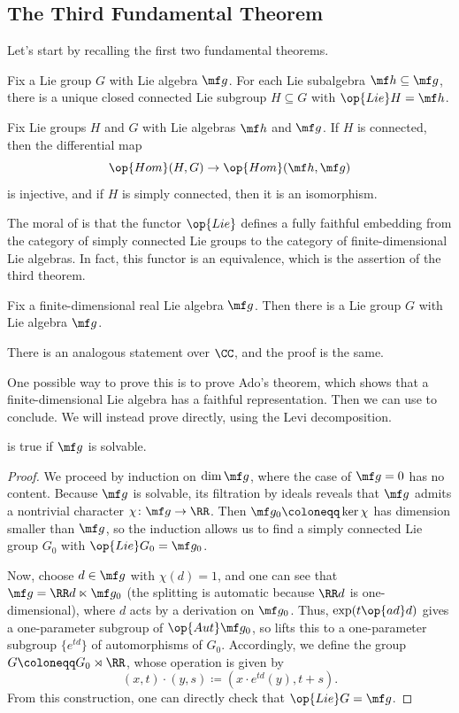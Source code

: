 \documentclass[../notes.tex]{subfiles}
\begin{document}
\subsection{The Third Fundamental Theorem}
Let's start by recalling the first two fundamental theorems.
\begin{theorem} \label{thm:lie-1}
	Fix a Lie group $G$ with Lie algebra $\mf g$. For each Lie subalgebra $\mf h\subseteq\mf g$, there is a unique closed connected Lie subgroup $H\subseteq G$ with $\op{Lie}H=\mf h$.
\end{theorem}
\begin{theorem} \label{thm:lie-2}
	Fix Lie groups $H$ and $G$ with Lie algebras $\mf h$ and $\mf g$. If $H$ is connected, then the differential map
	\[\op{Hom}(H,G)\to\op{Hom}(\mf h,\mf g)\]
	is injective, and if $H$ is simply connected, then it is an isomorphism.
\end{theorem}
The moral of  is that the functor $\op{Lie}$ defines a fully faithful embedding from the category of simply connected Lie groups to the category of finite-dimensional Lie algebras. In fact, this functor is an equivalence, which is the assertion of the third theorem.
\begin{theorem} \label{thm:lie-3}
	Fix a finite-dimensional real Lie algebra $\mf g$. Then there is a Lie group $G$ with Lie algebra $\mf g$.
\end{theorem}
\begin{remark}
	There is an analogous statement over $\CC$, and the proof is the same.
\end{remark}
One possible way to prove this is to prove Ado's theorem, which shows that a finite-dimensional Lie algebra has a faithful representation. Then we can use  to conclude. We will instead prove  directly, using the Levi decomposition.
\begin{lemma} \label{lem:lie-3-solvable}
	 is true if $\mf g$ is solvable.
\end{lemma}
\begin{proof}
	We proceed by induction on $\dim\mf g$, where the case of $\mf g=0$ has no content. Because $\mf g$ is solvable, its filtration by ideals reveals that $\mf g$ admits a nontrivial character $\chi\colon\mf g\to\RR$. Then $\mf g_0\coloneqq\ker\chi$ has dimension smaller than $\mf g$, so the induction allows us to find a simply connected Lie group $G_0$ with $\op{Lie}G_0=\mf g_0$.

	Now, choose $d\in\mf g$ with $\chi(d)=1$, and one can see that $\mf g=\RR d\ltimes\mf g_0$ (the splitting is automatic because $\RR d$ is one-dimensional), where $d$ acts by a derivation on $\mf g_0$. Thus, $\exp(t\op{ad}d)$ gives a one-parameter subgroup of $\op{Aut}\mf g_0$, so  lifts this to a one-parameter subgroup $\{e^{td}\}$ of automorphisms of $G_0$. Accordingly, we define the group $G\coloneqq G_0\rtimes\RR$, whose operation is given by
	\[(x,t)\cdot(y,s)\coloneqq\left(x\cdot e^{td}(y),t+s\right).\]
	From this construction, one can directly check that $\op{Lie}G=\mf g$.
\end{proof}
\end{document}
